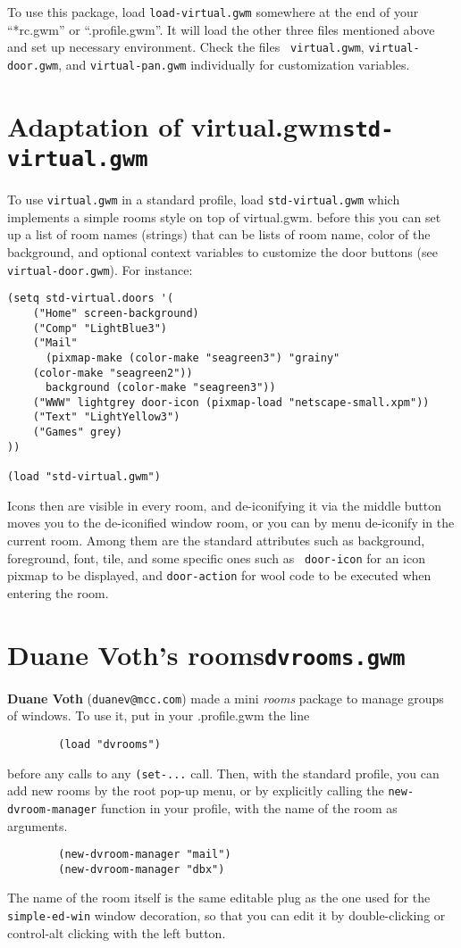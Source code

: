 To use this package, load {\tt load-virtual.gwm} somewhere at the end of
your ``*rc.gwm'' or ``.profile.gwm''. It will load the other three files
mentioned above and set up necessary environment. Check the files {\tt
virtual.gwm}, {\tt virtual-door.gwm}, and {\tt virtual-pan.gwm}
individually for customization variables.

\section{Adaptation of virtual.gwm\hfill{\tt std-virtual.gwm}}
\label{std-virtual}

To use {\tt virtual.gwm} in a standard profile, load {\tt std-virtual.gwm}
which implements a simple rooms style on top of virtual.gwm. before this you
can set up a list of room names (strings) that can be lists of room name,
color of the background, and optional context variables to customize the door
buttons (see {\tt virtual-door.gwm}). For instance:
\begin{verbatim}
(setq std-virtual.doors '(
    ("Home" screen-background)
    ("Comp" "LightBlue3")
    ("Mail" 
      (pixmap-make (color-make "seagreen3") "grainy" 
	(color-make "seagreen2"))
      background (color-make "seagreen3"))    
    ("WWW" lightgrey door-icon (pixmap-load "netscape-small.xpm"))
    ("Text" "LightYellow3")
    ("Games" grey)
))

(load "std-virtual.gwm")
\end{verbatim}

Icons then are visible in every room, and de-iconifying it via the middle
button moves you to the de-iconified window room, or you can by menu
de-iconify in the current room. Among them are the standard attributes such as
background, foreground, font, tile, and some specific ones such as {\tt
door-icon} for an icon pixmap to be displayed, and {\tt door-action} for wool
code to be executed when entering the room.

\section{Duane Voth's rooms\hfill{\tt dvrooms.gwm}}
\label{dvroom}

{\bf Duane Voth} (\verb"duanev@mcc.com") made a mini {\em rooms\/} 
package to manage groups of windows. To use it, put in your .profile.gwm
the line
\begin{verbatim}
        (load "dvrooms")
\end{verbatim}
before any calls to any \verb"(set-..." call.
Then, with the standard profile, you can add new rooms by the root pop-up menu,
or by explicitly calling the \verb"new-dvroom-manager" function in your
profile, with the name of the room as arguments.
{\exemplefont\begin{verbatim}
        (new-dvroom-manager "mail")
        (new-dvroom-manager "dbx")
\end{verbatim}}
The name of the room itself is the same editable plug as the one used for
the \verb"simple-ed-win" window decoration, so that you can edit it
by double-clicking or control-alt clicking with the left button.

